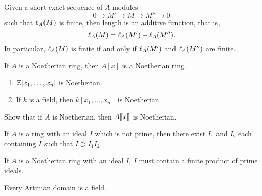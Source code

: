 \documentclass{ximera}
\begin{document}
\begin{proposition} Given a short exact sequence of $A$-modules
\[
0\to M' \to M\to M'' \to 0
\]
such that $\ell_A(M)$ is finite, then length is an additive function, that is,
\[
\ell_A(M) = \ell_A(M')+\ell_A(M'').
\]
In particular, $\ell_A(M)$ is finite if and only if $\ell_A(M')$ and $\ell_A(M'')$ are finite.
\end{proposition}


\begin{theorem} If $A$ is a Noetherian ring, then $A[x]$ is a Noetherian ring.
\end{theorem}

\begin{corollary}\hfill\begin{enumerate}
\item $\mathbb Z[x_1,\dots,x_n]$ is Noetherian.
\item If $k$ is a field, then $k[x_1,\dots,x_n]$ is Noetherian.
\end{enumerate}
\end{corollary}


\begin{exercise} Show that if $A$ is Noetherian, then $A[\hspace{-0.25ex}[ x]\hspace{-0.25ex}]$ is Noetherian.
\end{exercise}


\begin{lemma} If $A$ is a ring with an ideal $I$ which is not prime, then there exist $I_1$ and $I_2$ each containing $I$ such that $I\supset I_1I_2$.
\end{lemma}

\begin{lemma} If $A$ is a Noetherian ring with an ideal $I$, $I$ must contain a finite product of prime ideals.
\end{lemma}

\begin{lemma} Every Artinian domain is a field.
\end{lemma}




\end{document}

